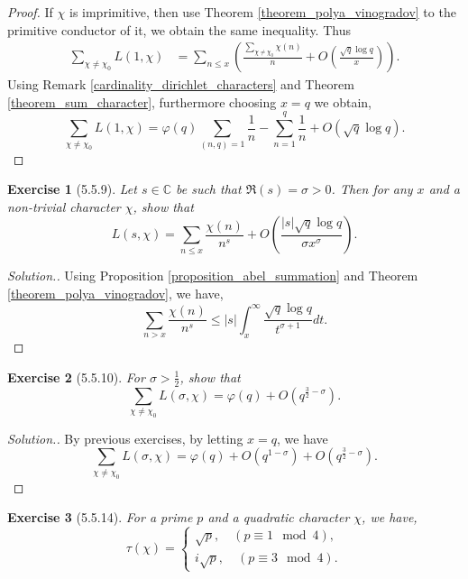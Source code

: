 \documentclass{article}
\newtheorem{exercise}{Exercise}[section]
\newcommand{\C}[0]{\mathbb{C}}
\begin{document}
\begin{proof}
  If $\chi$ is imprimitive, then use Theorem \ref{theorem_polya_vinogradov} to the primitive conductor of it, we obtain the same inequality. Thus 
  \begin{align*}
    \sum_{\chi\not=\chi_0}L(1,\chi) & = \sum_{n\leq x}\left({\frac {\sum_{\chi\not=\chi_0}\chi(n)} {n}}+O\left({\frac {\sqrt{q}\log q} {x}}\right)\right).
  \end{align*}
  Using Remark \ref{cardinality_dirichlet_characters} and Theorem \ref{theorem_sum_character}, furthermore choosing $x=q$ we obtain,
  \begin{equation*}
    \sum_{\chi\not=\chi_0}L(1,\chi) = \varphi(q)\sum_{(n,q)=1}{\frac 1 n}-\sum_{n=1}^q{\frac 1 n}+O(\sqrt{q}\log q).
  \end{equation*}
\end{proof}
\begin{exercise}[5.5.9]
  Let $s\in\C$ be such that $\Re(s)=\sigma>0$. Then for any $x$ and a non-trivial character $\chi$, show that
  \begin{equation*}
    L(s,\chi)=\sum_{n\leq x}{\frac {\chi(n)} {n^s}}+O\left({\frac {\vert s\vert\sqrt{q}\log q}{\sigma x^\sigma}}\right).
  \end{equation*}
\end{exercise}
\begin{proof}[Solution.]
  Using Proposition \ref{proposition_abel_summation} and Theorem \ref{theorem_polya_vinogradov}, we have,
  \begin{equation*}
    \sum_{n>x}{\frac {\chi(n)} {n^s}}\leq \vert s\vert \int_x^\infty {\frac {\sqrt{q}\log q} {t^{\sigma+1}}}dt.
  \end{equation*}
\end{proof}
\begin{exercise}[5.5.10]
  For $\sigma>{\frac 1 2}$, show that 
  \begin{equation*}
    \sum_{\chi\not=\chi_0}L(\sigma,\chi) = \varphi(q)+O(q^{{\frac 3 2}-\sigma}).
  \end{equation*}
\end{exercise}
\begin{proof}[Solution.]
  By previous exercises, by letting $x=q$, we have
  \begin{equation*}
     \sum_{\chi\not=\chi_0}L(\sigma,\chi) = \varphi(q) + O(q^{1-\sigma})+O(q^{{\frac 3 2}-\sigma}).
  \end{equation*}
\end{proof}
\begin{exercise}[5.5.14]
  For a prime $p$ and a quadratic character $\chi$, we have,
  \begin{equation*}
    \tau(\chi) = \begin{cases}
      \sqrt{p},\quad(p\equiv1\mod{4}),\\
      i\sqrt{p},\quad(p\equiv3\mod{4}).
    \end{cases}
  \end{equation*}
\end{exercise}
\end{document}
